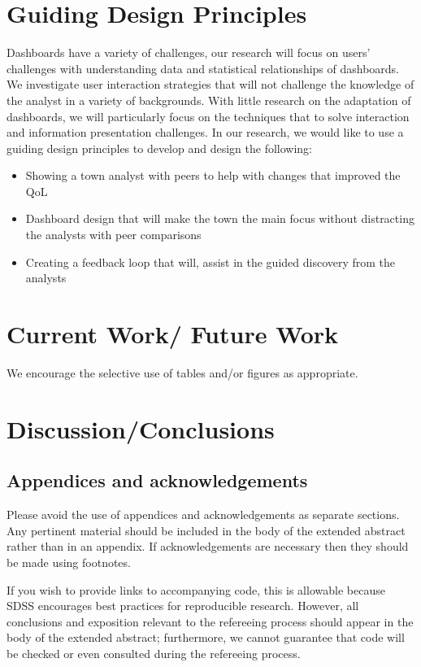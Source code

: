 \documentclass[10pt]{article}
\begin{document}
\section{Guiding Design Principles}
Dashboards have a variety of challenges, our research will focus on users' challenges with understanding data and statistical relationships of dashboards. We investigate user interaction strategies that will not challenge the knowledge of the analyst in a variety of backgrounds. With little research on the adaptation of dashboards, we will particularly focus on the techniques that to solve interaction and information presentation challenges. In our research, we would like to use a guiding design principles to develop and design the following:
\begin{itemize}
\item Showing a town analyst with peers to help with changes that improved the QoL
\item Dashboard design that will make the town the main focus without distracting the analysts with peer comparisons
\item Creating a feedback loop that will, assist in the guided discovery from the analysts
\end{itemize}


\section{Current Work/ Future Work}

We encourage the selective use of tables and/or figures as appropriate.



\section{Discussion/Conclusions}

\subsection{Appendices and acknowledgements}

Please avoid the use of appendices and acknowledgements 
as separate sections.  Any pertinent material should be included in the
body of the extended abstract rather than in an appendix.  If 
acknowledgements are necessary then they should be made using footnotes.

If you wish to provide links to accompanying code, this is allowable because
SDSS encourages best practices for reproducible research.  However, all
conclusions and exposition relevant to the refereeing process should appear in
the body of the extended abstract; furthermore, we cannot guarantee that 
code will be checked or even consulted during the refereeing process.
\end{document}
